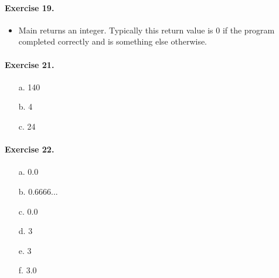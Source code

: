 \documentclass[12pt]{article}
\begin{document}
\paragraph{Exercise 19.}

\begin{itemize}
    \item 
    Main returns an integer.
    Typically this return value is 0 if the program completed correctly and is something else otherwise.
\end{itemize}

\paragraph{Exercise 21.}

\begin{itemize}
    \item [a.]
    140

    \item [b.]
    4

    \item [c.]
    24
\end{itemize}

\paragraph{Exercise 22.}

\begin{itemize}
    \item [a.]
    0.0

    \item [b.]
    0.6666...

    \item [c.]
    0.0

    \item [d.]
    3

    \item [e.]
    3

    \item [f.]
    3.0
\end{itemize}
\end{document}
